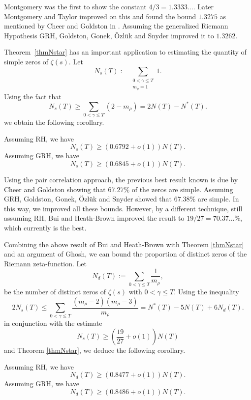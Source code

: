 \documentclass[reqno]{amsart}
\newcommand{\ga}{\gamma}
\begin{document}
Montgomery \cite{M} was the first to show the constant $4/3 = 1.3333...$. Later Montgomery and Taylor \cite{MT} improved on this and found the bound  $1.3275$ as mentioned by Cheer and Goldston in \cite{CG}. Assuming the generalized Riemann Hypothesis GRH, Goldston, Gonek, \"{O}zl\"{u}k and Snyder \cite{GGOS} improved it to $1.3262$. 

Theorem~\ref{thmNstar} has an important application to estimating the quantity of simple zeros of $\zeta(s)$. Let
\[
N_s(T):=\displaystyle\sum_{\substack{0<\gamma\leq T\\ m_\rho=1}}1.
\]
Using the fact that
\begin{equation}\label{eq:firstineq}
{N_s(T)\geq \displaystyle\sum_{0<\ga\leq T}(2-m_\rho)}=2N(T)-N^{*}(T).
\end{equation}
we obtain the following corollary.

\begin{corollary} 
Assuming RH, we have
\[
{N_s(T)}\geq ({0.6792} + o(1)){N(T)}.%
\]
Assuming GRH, we have
\[
{N_s(T)}\geq ({0.6845} + o(1)){N(T)}. %
\]
\end{corollary}

Using the pair correlation approach, the previous best result known is due by Cheer and Goldston \cite{CG} showing that $67.27\%$ of the zeros are simple. Assuming GRH, Goldston, Gonek, \"{O}zl\"{u}k and Snyder \cite{GGOS} showed that $67.38\%$ are simple. In this way, we improved all these bounds. However, by a different technique, still assuming RH, Bui and Heath-Brown \cite{BHB} improved the result to $19/27=70.37...\%$, which currently is the best.

Combining the above result of Bui and Heath-Brown with Theorem \ref{thmNstar} and an argument of Ghosh, we can bound the proportion of distinct zeros of the Riemann zeta-function. Let
\[
N_d(T) := \sum_{0<\gamma\leq T} \frac{1}{m_\rho},
\]
be the number of distinct zeros of $\zeta(s)$ with $0<\ga \leq T$. Using the inequality
\begin{equation}\label{eq:secondineq}
2N_s(T)\leq \displaystyle\sum_{0<\gamma\leq T}\dfrac{(m_\rho-2)(m_\rho-3)}{m_\rho}=N^{*}(T)-5N(T)+6N_d(T).
\end{equation}
in conjunction with the estimate
\[
N_s(T) \geq \left(\frac{19}{27}+o(1)\right)N(T)
\]
and Theorem \ref{thmNstar}, we deduce the following corollary.

\begin{corollary} 
Assuming RH, we have
\[
{N_d(T)}\geq ({0.8477} + o(1)){N(T)}.%
\]
Assuming GRH, we have
\[
{N_d(T)}\geq ({0.8486} + o(1)){N(T)}. %
\]
\end{corollary}
\end{document}
